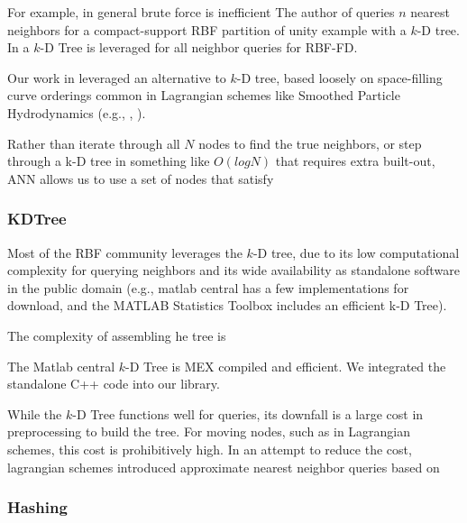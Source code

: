 \documentclass{report}
\begin{document}

For example, in general brute force is inefficient 
The author of \cite{Fasshauer2007} queries $n$ nearest neighbors for a compact-support RBF partition of unity example with a $k$-D tree. In \cite{FlyerLehto11,FornbergLehto11} a $k$-D Tree is leveraged for all neighbor queries for RBF-FD. 

Our work in \cite{BolligFlyerErlebacher2012} leveraged an alternative to $k$-D tree, based loosely on space-filling curve orderings common in Lagrangian schemes like Smoothed Particle Hydrodynamics (e.g., \cite{IanThesis}, \cite{Kelager}). %

Rather than iterate through all $N$ nodes to find the true neighbors, or step through a k-D tree in something like $O(log N)$ that requires extra built-out, ANN allows us to use a set of nodes that satisfy


\subsubsection{KDTree}
Most of the RBF community leverages the $k$-D tree, due to its low computational complexity for querying neighbors and its wide availability as standalone software in the public domain (e.g., matlab central has a few implementations for download, and the MATLAB Statistics Toolbox includes an efficient k-D Tree). 

The complexity of assembling he tree is

The Matlab central $k$-D Tree is MEX compiled and efficient. We integrated the standalone C++ code into our library.  

While the $k$-D Tree functions well for queries, its downfall is a large cost in preprocessing to build the tree. For moving nodes, such as in Lagrangian schemes, this cost is prohibitively high. In an attempt to reduce the cost, lagrangian schemes introduced approximate nearest neighbor queries based on 


\subsubsection{Hashing}
\end{document}
